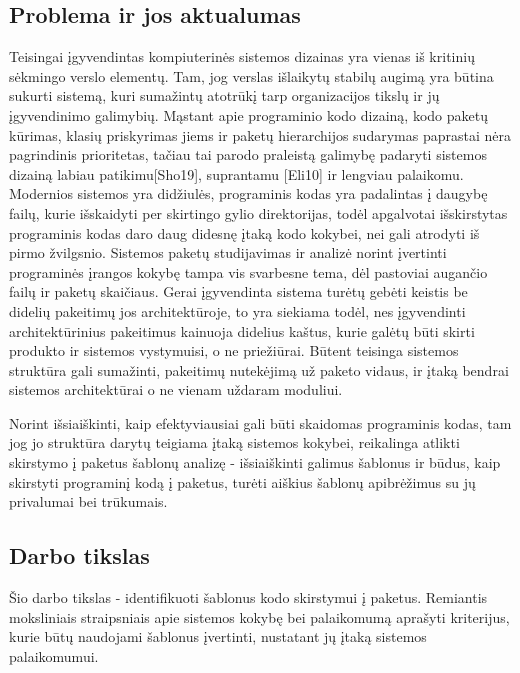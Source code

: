 \subsection{Problema ir jos aktualumas}
Teisingai įgyvendintas kompiuterinės sistemos dizainas yra vienas iš kritinių sėkmingo verslo
elementų.
Tam, jog verslas išlaikytų stabilų augimą yra būtina sukurti sistemą, kuri sumažintų
atotrūkį tarp organizacijos tikslų ir jų įgyvendinimo galimybių.
Mąstant apie programinio kodo
dizainą, kodo paketų kūrimas, klasių priskyrimas jiems ir paketų hierarchijos sudarymas paprastai
nėra pagrindinis prioritetas, tačiau tai parodo praleistą galimybę padaryti sistemos dizainą labiau
patikimu[Sho19], suprantamu [Eli10] ir lengviau palaikomu.
Modernios sistemos yra didžiulės, programinis kodas yra padalintas į daugybę failų,
kurie išskaidyti per skirtingo gylio direktorijas, todėl apgalvotai išskirstytas programinis
kodas daro daug didesnę įtaką kodo kokybei, nei gali atrodyti iš pirmo žvilgsnio.
Sistemos paketų studijavimas ir analizė norint įvertinti programinės įrangos kokybę
tampa vis svarbesne tema, dėl pastoviai augančio failų ir paketų skaičiaus\cite{DesignMetrics}.
Gerai įgyvendinta sistema turėtų gebėti keistis be didelių pakeitimų jos architektūroje,
to yra siekiama todėl, nes įgyvendinti architektūrinius pakeitimus kainuoja didelius kaštus, kurie
galėtų būti skirti produkto ir sistemos vystymuisi, o ne priežiūrai\cite{ModularStability}.
Būtent teisinga sistemos struktūra gali sumažinti, pakeitimų nutekėjimą už paketo vidaus, ir įtaką bendrai
sistemos architektūrai o ne vienam uždaram moduliui.


Norint išsiaiškinti, kaip efektyviausiai gali būti skaidomas programinis
kodas, tam jog jo struktūra darytų teigiama įtaką sistemos kokybei, reikalinga atlikti skirstymo į paketus šablonų analizę -
išsiaiškinti galimus šablonus ir būdus, kaip skirstyti programinį kodą į paketus, turėti aiškius šablonų apibrėžimus su jų
privalumai bei trūkumais.

\subsection{Darbo tikslas}
Šio darbo tikslas - identifikuoti šablonus kodo skirstymui į paketus.
Remiantis moksliniais straipsniais apie sistemos kokybę bei palaikomumą aprašyti kriterijus,
kurie būtų naudojami šablonus įvertinti, nustatant jų įtaką sistemos palaikomumui.

